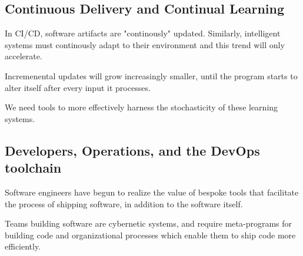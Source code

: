 \documentclass[12pt,initial,twoside,maitrise]{dms}
\numberwithin{equation}{section}
\numberwithin{table}{chapter}
\numberwithin{figure}{chapter}
\begin{document}
\subsection{Continuous Delivery and Continual Learning}

In CI/CD, software artifacts are "continously" updated. Similarly, intelligent systems must continously adapt to their environment and this trend will only accelerate.

Incremenental updates will grow increasingly smaller, until the program starts to alter itself after every input it processes.

We need tools to more effectively harness the stochasticity of these learning systems.

\subsection{Developers, Operations, and the DevOps toolchain}

Software engineers have begun to realize the value of bespoke tools that facilitate the process of shipping software, in addition to the software itself.

Teams building software are cybernetic systems, and require meta-programs for building code and organizational processes which enable them to ship code more efficiently.



\end{document}
